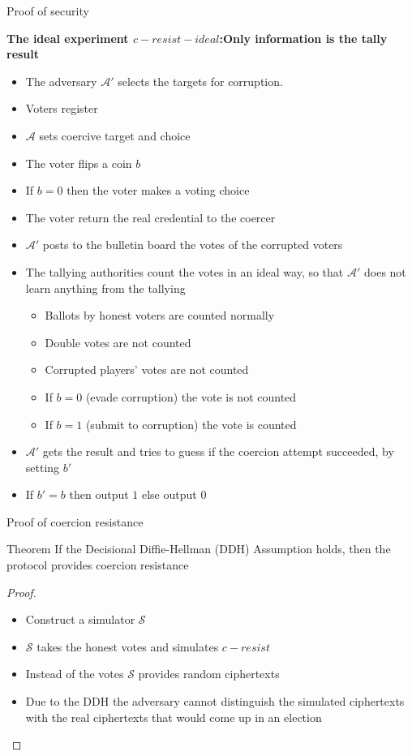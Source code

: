 \documentclass{beamer}
\begin{document}
\begin{frame}[allowframebreaks]{Proof of security}
\framebreak 

\textbf{The ideal experiment $c-resist-ideal$:Only information is the tally result}
\begin{itemize}
\item The adversary $\mathcal{A'}$ selects the targets for corruption.
\item Voters register 
\item $\mathcal{A}$ sets coercive target and choice
\item The voter flips a coin $b$
\item If $b=0$ then the voter makes a voting choice
\item The voter return the real credential to the coercer
\item $\mathcal{A}'$ posts to the bulletin board the votes of the corrupted voters

\framebreak 

\item The tallying authorities count the votes in an ideal way, so that $\mathcal{A}'$ does not learn anything from the tallying
\begin{itemize}
\item Ballots by honest voters are counted normally
\item Double votes are not counted
\item Corrupted players' votes are not counted
\item If $b=0$ (evade corruption) the vote is not counted
\item If $b=1$ (submit to corruption) the vote is counted
\end{itemize}
\item $\mathcal{A}'$ gets the result and tries to guess if the coercion attempt succeeded, by setting $b'$
\item If $b'=b$ then output $1$ else output $0$
\end{itemize}

\end{frame}

\begin{frame}{Proof of coercion resistance}
\begin{block}{Theorem}
If the Decisional Diffie-Hellman (DDH) Assumption holds, then the protocol provides coercion resistance
\end{block}
\begin{proof}
\begin{itemize}
\item Construct a simulator $\mathcal{S}$
\item  $\mathcal{S}$ takes the honest votes and simulates $c-resist$  
\item Instead of the votes $\mathcal{S}$ provides random ciphertexts
\item Due to the DDH the adversary cannot distinguish the simulated ciphertexts with the real ciphertexts that would come up in an election
\end{itemize}
\end{proof}
\end{frame}
\end{document}
